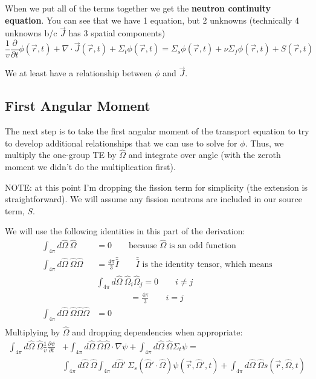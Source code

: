 \documentclass[12pt]{article}
\newlength{\up}
\newcommand{\vOmega}{\ensuremath{\hat{\Omega}}}
\begin{document}
\vspace*{2em}
When we put all of the terms together we get the \textbf{neutron continuity equation}. You can see that we have 1 equation, but 2 unknowns (technically 4 unknowns b/c $\vec{J}$ has 3 spatial components)
\begin{equation}
\frac{1}{v}\frac{\partial}{\partial t}\phi(\vec{r}, t) + 
\nabla \cdot \vec{J}(\vec{r}, t) + 
\Sigma_t \phi(\vec{r}, t) =
\Sigma_s \phi(\vec{r}, t) +
\nu \Sigma_f \phi(\vec{r}, t) +
S(\vec{r}, t)
\end{equation}

We at least have a relationship between $\phi$ and $\vec{J}$.

\subsection{First Angular Moment}

The next step is to take the first angular moment of the transport equation to try to develop additional relationships that we can use to solve for $\phi$. Thus, we multiply the one-group TE by $\vOmega$ and integrate over angle (with the zeroth moment we didn't do the multiplication first). 

NOTE: at this point I'm dropping the fission term for simplicity (the extension is straightforward). We will assume any fission neutrons are included in our source term, $S$. 


We will use the following identities in this part of the derivation:
\begin{align} 
\int_{4\pi} d\vOmega \:\vOmega &= 0 \qquad \text{because }\vOmega\text{ is an odd function} \\
%
\int_{4\pi} d\vOmega\: \vOmega \vOmega &= \frac{4\pi}{3}\bar{\bar{I}} \qquad \bar{\bar{I}}\text{ is the identity tensor, which means} \\
%
&\int_{4\pi} d\vOmega\: \vOmega_i \vOmega_j = 0 \qquad i \neq j \nonumber \\
&\qquad \qquad = \frac{4\pi}{3} \qquad i = j \nonumber \\
%
\int_{4\pi} d\vOmega \: \vOmega \vOmega \vOmega &= 0 \qquad \\
\end{align}
%
Multiplying by $\vOmega$ and dropping dependencies when appropriate:
%
\begin{align}
\int_{4\pi} d\vOmega\: \vOmega \frac{1}{v}\frac{\partial \psi}{\partial t} &+ 
\int_{4\pi} d\vOmega\: \vOmega \vOmega \cdot \nabla \psi + 
\int_{4\pi} d\vOmega\: \vOmega \Sigma_t \psi =\nonumber \\
&\int_{4\pi} d\vOmega\: \vOmega \int_{4\pi} d\vOmega'\: \Sigma_s(\vOmega' \cdot \vOmega) \psi(\vec{r}, \vOmega', t) +
\int_{4\pi} d\vOmega\: \vOmega s(\vec{r}, \vOmega, t)
\end{align}
\end{document}
